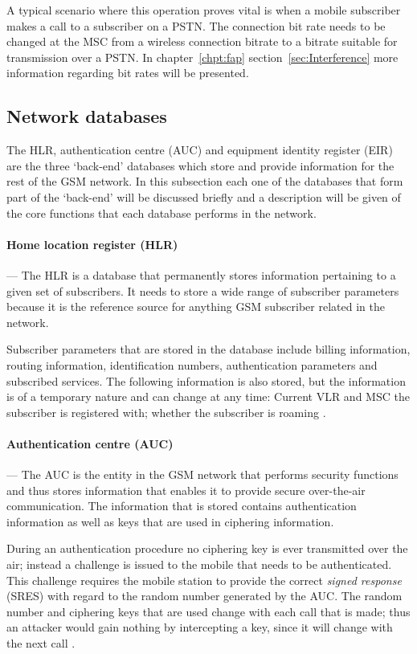 A typical scenario where this operation proves vital is when a mobile subscriber makes a call to a subscriber on a PSTN. The connection bit rate needs to be changed at the MSC from a wireless connection bitrate to a bitrate suitable for transmission over a PSTN. In chapter~\ref{chpt:fap} section~\ref{sec:Interference} more information regarding bit rates will be presented.

\subsection{Network databases}
The HLR, authentication centre (AUC) and equipment identity register (EIR) are the three `back-end' databases which store and provide information for the rest of the GSM network. In this subsection each one of the databases that form part of the `back-end' will be discussed briefly and a description will be given of the core functions that each database performs in the network.

\paragraph{Home location register (HLR)}
--- The HLR is a database that permanently stores information pertaining to a given set of subscribers. It needs to store a wide range of subscriber parameters because it is the reference source for anything GSM subscriber related in the network. 

Subscriber parameters that are stored in the database include billing information, routing information, identification numbers, authentication parameters and subscribed services. The following information is also stored, but the information is of a temporary nature and can change at any time: Current VLR and MSC the subscriber is registered with; whether the subscriber is roaming \cite{GSMSysEngin}.

\paragraph{Authentication centre (AUC)}
--- The AUC is the entity in the GSM network that performs security functions and thus stores information that enables it to provide secure over-the-air communication\cite{GSM92,GSMSysEngin}. The information that is stored contains authentication information as well as keys that are used in ciphering information\cite{GSM92,GSMSysEngin}.

During an authentication procedure no ciphering key is ever transmitted over the air; instead a challenge is issued to the mobile that needs to be authenticated. This challenge requires the mobile station to provide the correct \emph{signed response} (SRES) with regard to the random number generated by the AUC\cite{GSM92,GSMSysEngin}. The random number and ciphering keys that are used change with each call that is made; thus an attacker would gain nothing by intercepting a key, since it will change with the next call \cite{GSMSysEngin}.

